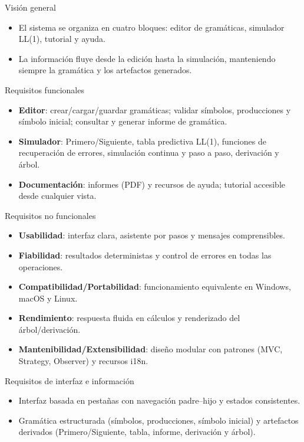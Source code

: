\begin{frame}{Visión general}
  \begin{itemize}
    \item El sistema se organiza en cuatro bloques: editor de gramáticas, simulador LL(1), tutorial y ayuda.
    \item La información fluye desde la edición hasta la simulación, manteniendo siempre la gramática y los artefactos generados.
  \end{itemize}
\end{frame}

\begin{frame}{Requisitos funcionales}
  \begin{itemize}
    \item \textbf{Editor}: crear/cargar/guardar gramáticas; validar símbolos, producciones y símbolo inicial; consultar y generar informe de gramática.
    \item \textbf{Simulador}: Primero/Siguiente, tabla predictiva LL(1), funciones de recuperación de errores, simulación continua y paso a paso, derivación y árbol.
    \item \textbf{Documentación}: informes (PDF) y recursos de ayuda; tutorial accesible desde cualquier vista.
  \end{itemize}
\end{frame}

\begin{frame}{Requisitos no funcionales}
  \begin{itemize}
    \item \textbf{Usabilidad}: interfaz clara, asistente por pasos y mensajes comprensibles.
    \item \textbf{Fiabilidad}: resultados deterministas y control de errores en todas las operaciones.
    \item \textbf{Compatibilidad/Portabilidad}: funcionamiento equivalente en Windows, macOS y Linux.
    \item \textbf{Rendimiento}: respuesta fluida en cálculos y renderizado del árbol/derivación.
    \item \textbf{Mantenibilidad/Extensibilidad}: diseño modular con patrones (MVC, Strategy, Observer) y recursos i18n.
  \end{itemize}
\end{frame}

\begin{frame}{Requisitos de interfaz e información}
  \begin{itemize}
    \item Interfaz basada en pestañas con navegación padre–hijo y estados consistentes.
    \item Gramática estructurada (símbolos, producciones, símbolo inicial) y artefactos derivados (Primero/Siguiente, tabla, informe, derivación y árbol).
  \end{itemize}
\end{frame}


